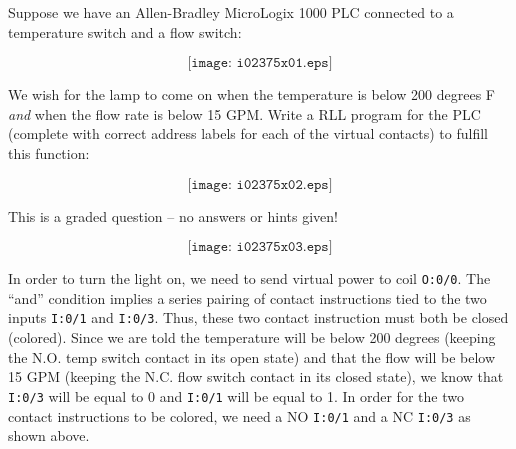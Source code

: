 

Suppose we have an Allen-Bradley MicroLogix 1000 PLC connected to a temperature switch and a flow switch:

$$\texttt{[image: i02375x01.eps]}$$

We wish for the lamp to come on when the temperature is below 200 degrees F {\it and} when the flow rate is below 15 GPM.  Write a RLL program for the PLC (complete with correct address labels for each of the virtual contacts) to fulfill this function:

$$\texttt{[image: i02375x02.eps]}$$

\vfil

\eject






This is a graded question -- no answers or hints given!







$$\texttt{[image: i02375x03.eps]}$$

In order to turn the light on, we need to send virtual power to coil {\tt O:0/0}.  The ``and'' condition implies a series pairing of contact instructions tied to the two inputs {\tt I:0/1} and {\tt I:0/3}.  Thus, these two contact instruction must both be closed (colored).  Since we are told the temperature will be below 200 degrees (keeping the N.O. temp switch contact in its open state) and that the flow will be below 15 GPM (keeping the N.C. flow switch contact in its closed state), we know that {\tt I:0/3} will be equal to 0 and {\tt I:0/1} will be equal to 1.  In order for the two contact instructions to be colored, we need a NO {\tt I:0/1} and a NC {\tt I:0/3} as shown above.




